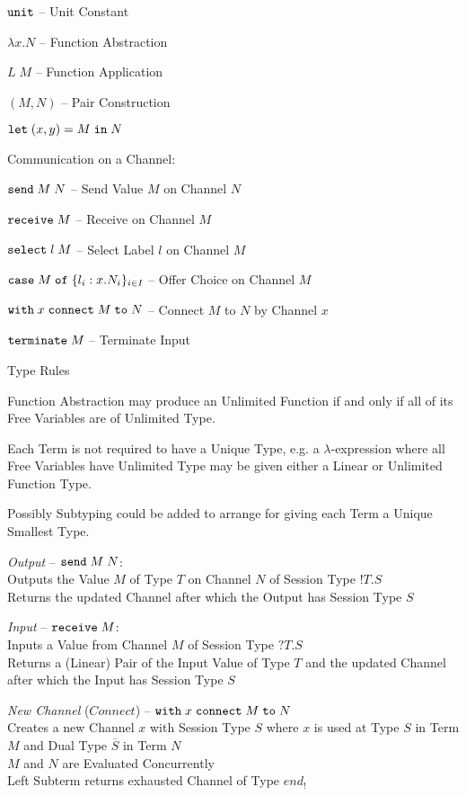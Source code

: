 $\mathtt{unit}$ -- Unit Constant

$\lambda x.N$ -- Function Abstraction

$L\;M$ -- Function Application

$(M,N)$ -- Pair Construction

$\mathtt{let}\; (x,y) = M \;\mathtt{in}\; N$

Communication on a Channel:

$\mathtt{send}\; M\;N$ -- Send Value $M$ on Channel $N$

$\mathtt{receive}\; M$ -- Receive on Channel $M$

$\mathtt{select}\; l\;M$ -- Select Label $l$ on Channel $M$

$\mathtt{case}\; M \;\mathtt{of}\; \{l_i:x.N_i\}_{i\in I}$ -- Offer Choice
on Channel $M$

$\mathtt{with}\; x \;\mathtt{connect}\; M \;\mathtt{to}\; N$ -- Connect $M$
to $N$ by Channel $x$

$\mathtt{terminate}\; M$ -- Terminate Input


Type Rules

Function Abstraction may produce an Unlimited Function if and only if
all of its Free Variables are of Unlimited Type.

Each Term is not required to have a Unique Type, e.g. a
$\lambda$-expression where all Free Variables have Unlimited Type may
be given either a Linear or Unlimited Function Type.

Possibly Subtyping could be added to arrange for giving each Term a
Unique Smallest Type.


\asterism


\emph{Output} -- $\mathtt{send}\; M\;N$: \\
Outputs the Value $M$ of Type $T$ on Channel $N$ of Session Type
$!T.S$ \\
Returns the updated Channel after which the Output has Session Type
$S$

\emph{Input} -- $\mathtt{receive}\; M$: \\
Inputs a Value from Channel $M$ of Session Type $?T.S$ \\
Returns a (Linear) Pair of the Input Value of Type $T$ and the updated
Channel after which the Input has Session Type $S$

\emph{New Channel} ($Connect$) -- $\mathtt{with}\; x \;\mathtt{connect}\;
M \;\mathtt{to}\; N$ \\
Creates a new Channel $x$ with Session Type $S$ where $x$ is used at
Type $S$ in Term $M$ and Dual Type $\overline{S}$ in Term $N$ \\
$M$ and $N$ are Evaluated Concurrently \\
Left Subterm returns exhausted Channel of Type $end_!$ %

